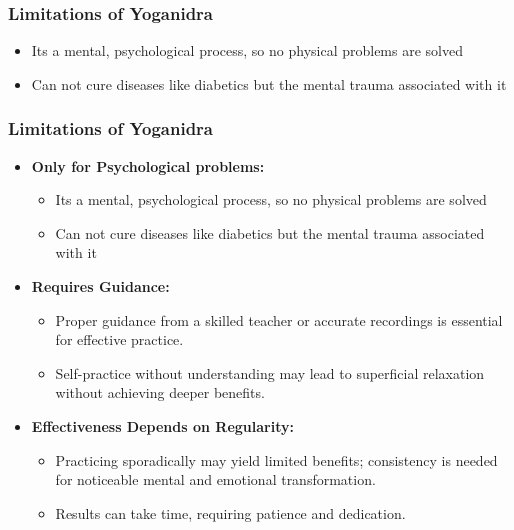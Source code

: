 \begin{frame}[fragile]\frametitle{Limitations of Yoganidra}
    \begin{itemize}
        \item Its a mental, psychological process, so no physical problems are solved
		\item Can not cure diseases like diabetics but the mental trauma associated with it
    \end{itemize}
\end{frame}

\begin{frame}[fragile]\frametitle{Limitations of Yoganidra}
    \begin{itemize}
	    \item \textbf{Only for Psychological problems:} 
			\begin{itemize}
				\item Its a mental, psychological process, so no physical problems are solved
				\item Can not cure diseases like diabetics but the mental trauma associated with it
			\end{itemize}
			
        \item \textbf{Requires Guidance:} 
            \begin{itemize}
                \item Proper guidance from a skilled teacher or accurate recordings is essential for effective practice.
                \item Self-practice without understanding may lead to superficial relaxation without achieving deeper benefits.
            \end{itemize}
        

        \item \textbf{Effectiveness Depends on Regularity:}
            \begin{itemize}
                \item Practicing sporadically may yield limited benefits; consistency is needed for noticeable mental and emotional transformation.
                \item Results can take time, requiring patience and dedication.
            \end{itemize}
        

\end{itemize}
\end{frame}
